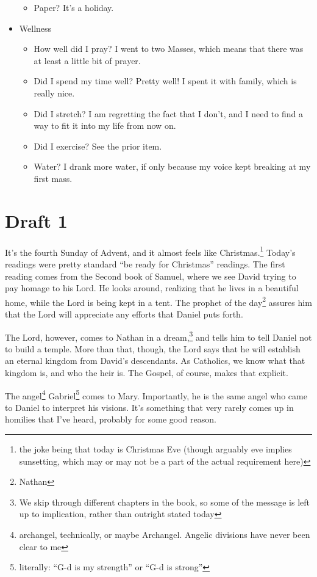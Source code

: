 \documentclass[12pt]{article}[titlepage]
\newcommand{\say}[1]{``#1''}
\newcommand{\1}{\={a}}
\newcommand{\2}{\={e}}
\newcommand{\3}{\={\i}}
\newcommand{\4}{\=o}
\newcommand{\5}{\=u}
\newcommand{\6}{\={A}}
\renewcommand{\,}{\textsuperscript{,}}
\begin{document}
\begin{itemize}
\begin{itemize}
\item Paper? It's a holiday.
\end{itemize}
\item Wellness
\begin{itemize}
\item How well did I pray? I went to two Masses, which means that there was at least a little bit of prayer.
\item Did I spend my time well? Pretty well! I spent it with family, which is really nice.
\item Did I stretch? I am regretting the fact that I don't, and I need to find a way to fit it into my life from now on.
\item Did I exercise? See the prior item.
\item Water? I drank more water, if only because my voice kept breaking at my first mass.
\end{itemize}
\end{itemize}

\section{Draft 1}
It's the fourth Sunday of Advent, and it almost feels like Christmas.\footnote{the joke being that today is Christmas Eve (though arguably eve implies sunsetting, which may or may not be a part of the actual requirement here)}
Today's readings were pretty standard \say{be ready for Christmas} readings.
The first reading comes from the Second book of Samuel, where we see David trying to pay homage to his Lord.
He looks around, realizing that he lives in a beautiful home, while the Lord is being kept in a tent.
The prophet of the day\footnote{Nathan} assures him that the Lord will appreciate any efforts that Daniel puts forth.

The Lord, however, comes to Nathan in a dream,\footnote{We skip through different chapters in the book, so some of the message is left up to implication, rather than outright stated today} and tells him to tell Daniel not to build a temple.
More than that, though, the Lord says that he will establish an eternal kingdom from David's descendants.
As Catholics, we know what that kingdom is, and who the heir is.
The Gospel, of course, makes that explicit.

The angel\footnote{archangel, technically, or maybe Archangel. Angelic divisions have never been clear to me} Gabriel\footnote{literally: \say{G-d is my strength} or \say{G-d is strong}} comes to Mary.
Importantly, he is the same angel who came to Daniel to interpret his visions.
It's something that very rarely comes up in homilies that I've heard, probably for some good reason.
\end{document}

